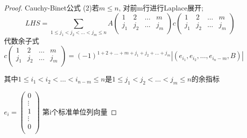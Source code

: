 \begin{proof}{Cauchy-Binet公式}{}
  (2)若$m\leq n$, 对前m行进行Laplace展开; 
  \[LHS=\sum_{1\leq j_1<j_2<\dots<j_m\leq n}
  A\begin{pmatrix}
    1 & 2 & \dots & m \\
    j_1 & j_2 & \dots & j_m \\
  \end{pmatrix}
  c\begin{pmatrix}
    1 & 2 & \dots & m \\
    j_1 & j_2 & \dots & j_m \\
  \end{pmatrix}
  \]
  代数余子式
  $c\begin{pmatrix}
    1 & 2 & \dots & m \\
    j_1 & j_2 & \dots & j_m \\
  \end{pmatrix}
  =(-1)^{1+2+\dots+m+j_1+j_2+\dots+j_m}|(e_{i_1},e_{i_2},\dots,e_{i_n-m},B)|$

  其中$1\leq i_1<i_2<\dots<i_{n-m}\leq n$是$1\leq j_1<j_2<\dots <j_m\leq n$的余指标

  $e_i=\begin{pmatrix}
    0 \\
    \vdots\\
    1\\
    \vdots\\
    0\\
  \end{pmatrix}$
  第i个标准单位列向量
\end{proof}



